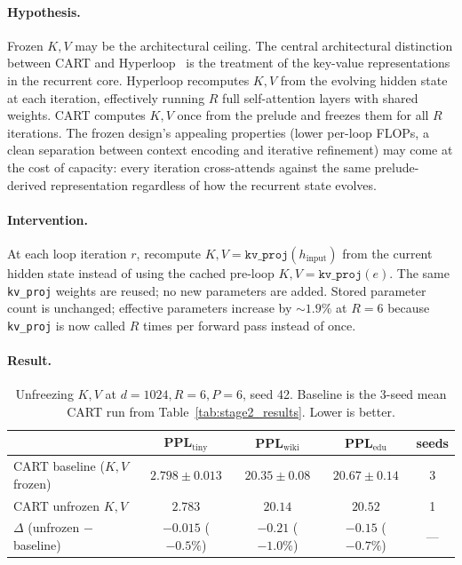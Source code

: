 \documentclass{article}
\newcommand{\cart}{\textsc{CART}}
\newcommand{\pplwiki}{PPL$_\text{wiki}$}
\newcommand{\ppltiny}{PPL$_\text{tiny}$}
\newcommand{\ppledu}{PPL$_\text{edu}$}
\begin{document}
\paragraph{Hypothesis.}
Frozen $K, V$ may be the architectural ceiling. The central architectural distinction between \cart{} and Hyperloop~\citep{zeitoun2026hyperloop} is the treatment of the key-value representations in the recurrent core. Hyperloop recomputes $K, V$ from the evolving hidden state at each iteration, effectively running $R$ full self-attention layers with shared weights. \cart{} computes $K, V$ once from the prelude and freezes them for all $R$ iterations. The frozen design's appealing properties (lower per-loop FLOPs, a clean separation between context encoding and iterative refinement) may come at the cost of capacity: every iteration cross-attends against the same prelude-derived representation regardless of how the recurrent state evolves.

\paragraph{Intervention.}
At each loop iteration $r$, recompute $K, V = \texttt{kv\_proj}(h_\text{input})$ from the current hidden state instead of using the cached pre-loop $K, V = \texttt{kv\_proj}(e)$. The same \texttt{kv\_proj} weights are reused; no new parameters are added. Stored parameter count is unchanged; effective parameters increase by $\sim 1.9\%$ at $R{=}6$ because \texttt{kv\_proj} is now called $R$ times per forward pass instead of once.

\paragraph{Result.}

\begin{table}[htbp]
\centering
\caption{Unfreezing $K, V$ at $d{=}1024, R{=}6, P{=}6$, seed 42. Baseline is the 3-seed mean \cart{} run from Table~\ref{tab:stage2_results}. Lower is better.}
\label{tab:abl_unfreezekv}
\footnotesize
\begin{tabular}{lcccc}
\toprule
 & \ppltiny & \pplwiki & \ppledu & seeds \\
\midrule
\cart{} baseline ($K, V$ frozen)         & $2.798 \pm 0.013$ & $20.35 \pm 0.08$ & $20.67 \pm 0.14$ & 3 \\
\cart{} unfrozen $K, V$                  & $2.783$           & $20.14$          & $20.52$          & 1 \\
\midrule
$\Delta$ (unfrozen $-$ baseline)         & $-0.015$ ($-0.5\%$) & $-0.21$ ($-1.0\%$) & $-0.15$ ($-0.7\%$) & --- \\
\bottomrule
\end{tabular}
\end{table}
\end{document}
